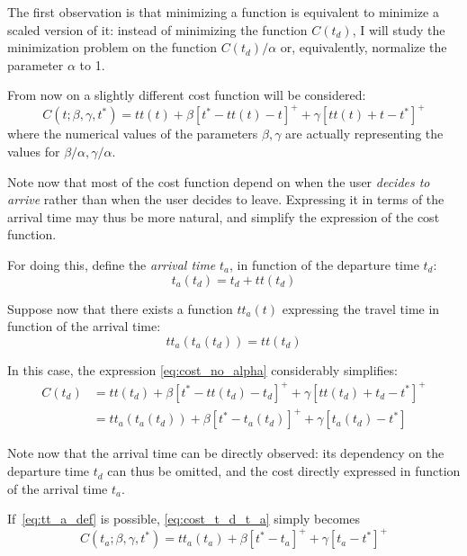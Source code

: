 The first observation is that minimizing a function is equivalent to minimize a scaled version of it:
instead of minimizing the function \(C(t_d)\),
I will study the minimization problem on the function \(C(t_d)/\alpha\) or,
equivalently, normalize the parameter \(\alpha\) to 1.

From now on a slightly different cost function will be considered:
\begin{equation}
  \label{eq:cost_no_alpha}
  C(t; \beta, \gamma, t^*) = tt(t) + \beta [t^* - tt(t) - t]^+ + \gamma[tt(t) + t - t^*]^+
\end{equation}
where the numerical values of the parameters \(\beta, \gamma\) are actually representing the values for \(\beta/\alpha, \gamma/\alpha\).

Note now that most of the cost function depend on when the user \textit{decides to arrive} rather than when the user decides to leave.
Expressing it in terms of the arrival time may thus be more natural,
and simplify the expression of the cost function.

For doing this, define the \textit{arrival time} \(t_a\), in function of the departure time \(t_d\):
\[t_a(t_d) = t_d + tt(t_d)\]

Suppose now that there exists a function \(tt_a(t)\) expressing the travel time in function of the arrival time:
\begin{equation}
  \label{eq:tt_a_def}
  tt_a(t_a(t_d)) = tt(t_d)
\end{equation}

In this case, the expression \eqref{eq:cost_no_alpha} considerably simplifies:
\begin{equation}
  \label{eq:cost_t_d_t_a}
  \begin{split}
    C(t_d) & = tt(t_d) + \beta [t^* - tt(t_d) - t_d]^+ + \gamma[tt(t_d) + t_d - t^*]^+ \\
           & = tt_a(t_a(t_d)) + \beta [t^* - t_a(t_d)]^+ + \gamma [t_a(t_d) - t^*]
  \end{split}
\end{equation}

Note now that the arrival time can be directly observed:
its dependency on the departure time \(t_d\) can thus be omitted,
and the cost directly expressed in function of the arrival time \(t_a\).

If~\eqref{eq:tt_a_def} is possible, \eqref{eq:cost_t_d_t_a} simply becomes
\begin{equation}
  \label{eq:cost_simplified}
  C(t_a; \beta, \gamma, t^*) = tt_a(t_a) + \beta [t^* - t_a]^+ + \gamma [t_a - t^*]^+
\end{equation}

